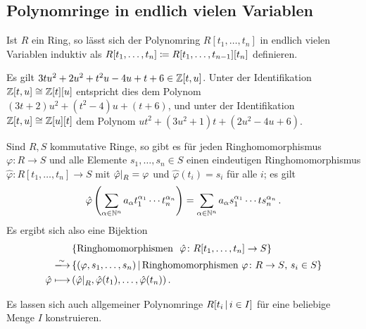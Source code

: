 \subsection{Polynomringe in endlich vielen Variablen}

Ist $R$ ein Ring, so lässt sich der Polynomring $R[t_1, \dotsc, t_n]$ in endlich vielen Variablen induktiv als $R[t_1, \dotsc, t_n] \coloneqq R[t_1, \dotsc, t_{n-1}][t_n]$ definieren.

\begin{example}
  Es gilt $3tu^2 + 2u^2 + t^2 u - 4u + t + 6 \in \mathbb{Z}[t, u]$.
  Unter der Identifikation $\mathbb{Z}[t,u] \cong \mathbb{Z}[t][u]$ entspricht dies dem Polynom $(3t+2) u^2 + (t^2 - 4)u + (t + 6)$, und unter der Identifikation $\mathbb{Z}[t,u] \cong \mathbb{Z}[u][t]$ dem Polynom $ut^2 + (3u^2 + 1)t + (2u^2 - 4u + 6)$.
\end{example}


\begin{theorem}
  Sind $R, S$ kommutative Ringe, so gibt es für jeden Ringhomomorphismus $\varphi \colon R \to S$ und alle Elemente $s_1, \dotsc, s_n \in S$ einen eindeutigen Ringhomomorphismus $\hat{\varphi} \colon R[t_1, \dotsc, t_n] \to S$ mit $\restrict{\hat{\varphi}}{R} = \varphi$ und $\hat{\varphi}(t_i) = s_i$ für alle $i$;
  es gilt
  \[
      \hat{\varphi}\left( \sum_{\alpha \in \mathbb{N}^n} a_\alpha t_1^{\alpha_1} \dotsm t_n^{\alpha_n} \right)
    = \sum_{\alpha \in \mathbb{N}^n} a_\alpha s_1^{\alpha_1} \dotsm ts_n^{\alpha_n} \,.
  \]
  Es ergibt sich also eine Bijektion
  \begin{align*}
                          &\, \{\text{Ringhomomorphismen \ $\hat{\varphi} \colon R[t_1, \dotsc, t_n] \to S$}\}  \\
    \xlongrightarrow{\sim}&\, \{
                                (\varphi, s_1, \dotsc, s_n)
                              \suchthat
                                  \text{Ringhomomorphismen $\varphi \colon R \to S$, $s_i \in S$}
                              \}  \\
                              \hat{\varphi}
    \longmapsto&\,            ( \restrict{\hat{\varphi}}{R}, \hat{\varphi}(t_1), \dotsc, \hat{\varphi}(t_n) ) \,.
  \end{align*}
\end{theorem}

\begin{remark}
  Es lassen sich auch allgemeiner Polynomringe $R[t_i \suchthat i \in I]$ für eine beliebige Menge $I$ konstruieren.
\end{remark}

